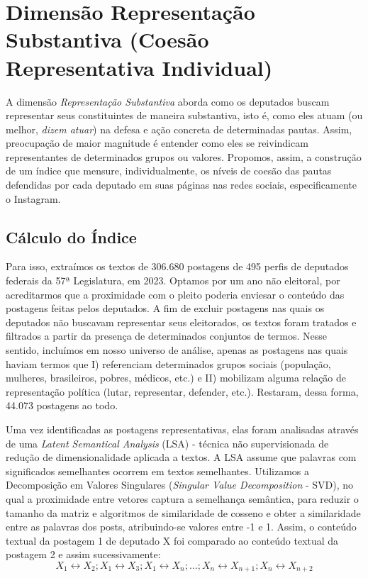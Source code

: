 \section{Dimensão Representação Substantiva (Coesão Representativa Individual)}

A dimensão \textit{Representação Substantiva} aborda como os deputados buscam representar seus constituintes de maneira substantiva, isto é, como eles atuam (ou melhor, \textit{dizem atuar}) na defesa e ação concreta de determinadas pautas. Assim, preocupação de maior magnitude é entender como eles se reivindicam representantes de determinados grupos ou valores. Propomos, assim, a construção de um índice que mensure, individualmente, os níveis de coesão das pautas defendidas por cada deputado em suas páginas nas redes sociais, especificamente o Instagram.

\subsection*{Cálculo do Índice}

Para isso, extraímos os textos de 306.680 postagens de 495 perfis de deputados federais da 57ª Legislatura, em 2023. Optamos por um ano não eleitoral, por acreditarmos que a proximidade com o pleito poderia enviesar o conteúdo das postagens feitas pelos deputados. A fim de excluir postagens nas quais os deputados não buscavam representar seus eleitorados, os textos foram tratados e filtrados a partir da presença de determinados conjuntos de termos. Nesse sentido, incluímos em nosso universo de análise, apenas as postagens nas quais haviam termos que I) referenciam determinados grupos sociais (população, mulheres, brasileiros, pobres, médicos, etc.) e II) mobilizam alguma relação de representação política (lutar, representar, defender, etc.).
Restaram, dessa forma, 44.073 postagens ao todo.

Uma vez identificadas as postagens representativas, elas foram analisadas através de uma \textit{Latent Semantical Analysis} (LSA) - técnica não supervisionada de redução de dimensionalidade aplicada a textos. A LSA assume que palavras com significados semelhantes ocorrem em textos semelhantes. Utilizamos a Decomposição em Valores Singulares (\textit{Singular Value Decomposition} - SVD), no qual a proximidade entre vetores captura a semelhança semântica, para reduzir o tamanho da matriz e algoritmos de similaridade de cosseno e obter a similaridade entre as palavras dos posts, atribuindo-se valores entre -1 e 1. Assim, o conteúdo textual da postagem 1 de deputado X foi comparado ao conteúdo textual da postagem 2 e assim sucessivamente:
\[
X_1 \leftrightarrow X_2; X_1 \leftrightarrow X_3; X_1 \leftrightarrow X_n; \ldots; X_n \leftrightarrow X_{n+1}; X_n \leftrightarrow X_{n+2}
\]

